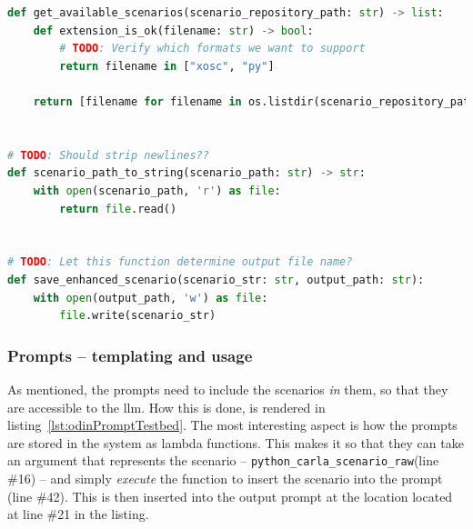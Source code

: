 \begin{lstlisting}[caption={scenario\_utils.py, The implementation of an various scenaro helper functions for executing prompts.}, label={lst:odinScenarioUtils}, language={Python}]
def get_available_scenarios(scenario_repository_path: str) -> list:
    def extension_is_ok(filename: str) -> bool:
        # TODO: Verify which formats we want to support
        return filename in ["xosc", "py"]

    return [filename for filename in os.listdir(scenario_repository_path) if extension_is_ok(filename)]


# TODO: Should strip newlines??
def scenario_path_to_string(scenario_path: str) -> str:
    with open(scenario_path, 'r') as file:
        return file.read()


# TODO: Let this function determine output file name?
def save_enhanced_scenario(scenario_str: str, output_path: str):
    with open(output_path, 'w') as file:
        file.write(scenario_str)
\end{lstlisting}

\subsubsection{Prompts -- templating and usage}

As mentioned, the prompts need to include the scenarios \emph{in} them, so that
they are accessible to the \acrshort{llm}. How this is done, is rendered in
listing~\ref{lst:odinPromptTestbed}. The most interesting aspect is how the
prompts are stored in the system as lambda functions. This makes it so that they
can take an argument that represents the scenario --
\texttt{python\_carla\_scenario\_raw}(line \#16) -- and simply \emph{execute} the
function to insert the scenario into the prompt (line \#42). This is then
inserted into the output prompt at the location located at line \#21 in the listing.

